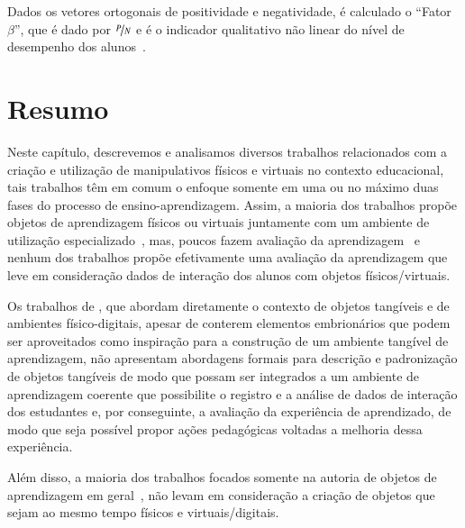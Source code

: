 Dados os vetores ortogonais de positividade e negatividade, é calculado o ``Fator $\beta$'', que é dado por $\nicefrac{P}{N}$ e é o indicador qualitativo não linear do nível de desempenho dos alunos~\citep{sales:2012}.

\section{Resumo}
Neste capítulo, descrevemos e analisamos diversos trabalhos relacionados com a criação e utilização de manipulativos físicos e virtuais no contexto educacional, tais trabalhos têm em comum o enfoque somente em uma ou no máximo duas fases do processo de ensino-aprendizagem. Assim, a maioria dos trabalhos propõe objetos de aprendizagem físicos ou virtuais juntamente com um ambiente de utilização especializado~\citep{zacharia:2011, Salehi:2014, ha:2018, Blikstein:2012, Blikstein2016, Azad:2016, imamura:2018}, mas, poucos fazem avaliação da aprendizagem~\citep{zacharia:2011,Salehi:2014,ha:2018} e nenhum dos trabalhos propõe efetivamente uma avaliação da aprendizagem que leve em consideração dados de interação dos alunos com objetos físicos/virtuais.

Os trabalhos de \cite{Santos:2014, imamura:2018, lima:2016, gluz:2018}, que abordam diretamente o contexto de objetos tangíveis e de ambientes físico-digitais, apesar de conterem elementos embrionários que podem ser aproveitados como inspiração para a construção de um ambiente tangível de aprendizagem, não apresentam abordagens formais para descrição e padronização de objetos tangíveis de modo que possam ser integrados a um ambiente de aprendizagem coerente que possibilite o registro e a análise de dados de interação dos estudantes e, por conseguinte, a avaliação da experiência de aprendizado, de modo que seja possível propor ações pedagógicas voltadas a melhoria dessa experiência.

Além disso, a maioria dos trabalhos focados somente na autoria de objetos de aprendizagem em geral~\citep{Passos:2010, Orlandi:2012, Guterres:2014}, não levam em consideração a criação de objetos que sejam ao mesmo tempo físicos e virtuais/digitais.


